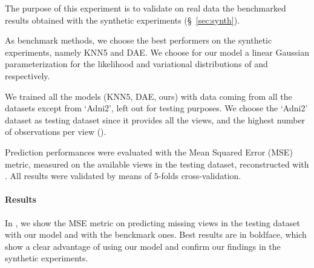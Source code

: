 The purpose of this experiment is to validate on real data the benchmarked results obtained with the synthetic experiments (\S~\ref{sec:synth}).

As benchmark methods, we choose the best performers on the synthetic experiments, namely KNN5 and DAE.
We choose for our model a linear Gaussian parameterization for the likelihood and variational distributions of  and  respectively.

We trained all the models (KNN5, DAE, ours) with data coming from all the datasets except from `Adni2', left out for testing purposes.
We choose the `Adni2' dataset as testing dataset since it provides all the views, and the highest number of observations per view ().

Prediction performances were evaluated with the Mean Squared Error (MSE) metric, measured on the available views in the testing dataset, reconstructed with .
All results were validated by means of $5$-folds cross-validation.

\paragraph{Results}
In , we show the MSE metric on predicting missing views in the testing dataset with our model and with the benckmark ones.
Best results are in boldface, which show a clear advantage of using our model and confirm our findings in the synthetic experiments.

